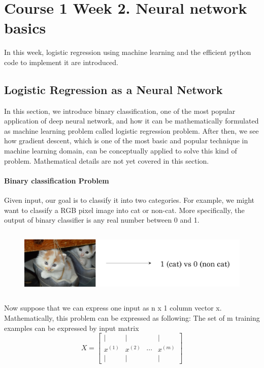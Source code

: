 \newtheorem{theorem}{Theorem}

\section{Course 1 Week 2. Neural network basics} In this week, logistic regression using machine learning and the efficient python code to implement it are introduced. 

\subsection{Logistic Regression as a Neural Network} In this section, we introduce binary classification, one of the most popular application of deep neural network, and how it can be mathematically formulated as machine learning problem called logistic regression problem. After then, we see how gradient descent, which is one of the most basic and popular technique in machine learning domain, can be conceptually applied to solve this kind of problem. Mathematical details are not yet covered in this section.

\paragraph{Binary classification Problem} Given input, our goal is to classify it into two categories. For example, we might want to classify a RGB pixel image into cat or non-cat. More specifically, the output of binary classifier is any real number between 0 and 1.

\begin{figure}[H]
\centering
\includegraphics[height=3.2cm]{c1w2s1_pic1.png}
\caption{}
\end{figure}

Now suppose that we can express one input as n x 1 column vector x. Mathematically, this problem can be expressed as following:\newline
The set of m training examples can be expressed by input matrix \newline
\begin{equation}
X = 
    \begin{bmatrix}
        | & | &  & | \\
        x^{(1)} & x^{(2)} & \cdots & x^{(m)} \\
        | & | &  & |
    \end{bmatrix}
\end{equation}

